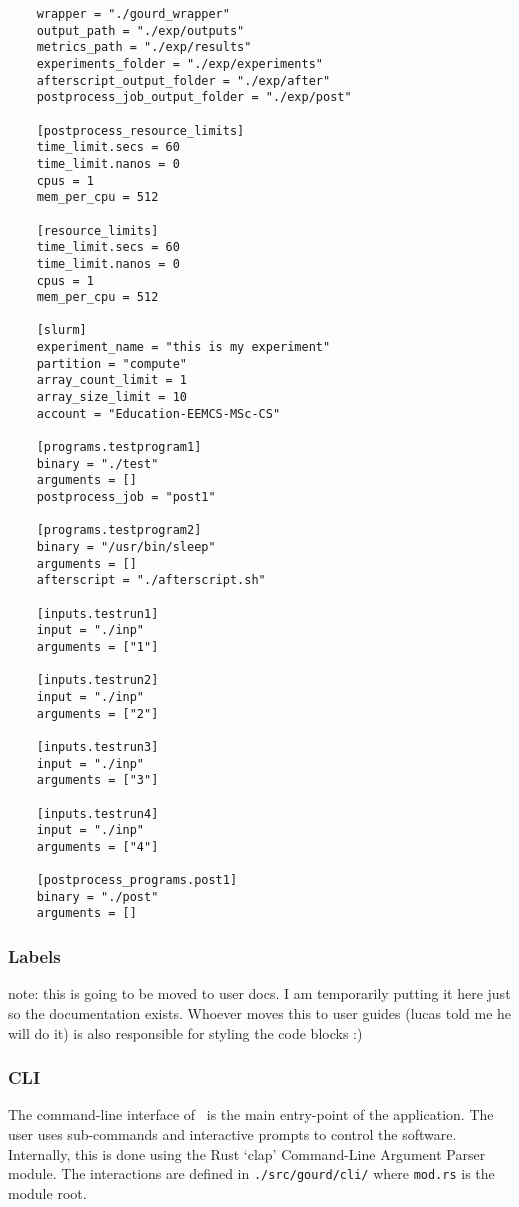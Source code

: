 \begin{verbatim}
    wrapper = "./gourd_wrapper"
    output_path = "./exp/outputs"
    metrics_path = "./exp/results"
    experiments_folder = "./exp/experiments"
    afterscript_output_folder = "./exp/after"
    postprocess_job_output_folder = "./exp/post"

    [postprocess_resource_limits]
    time_limit.secs = 60
    time_limit.nanos = 0
    cpus = 1
    mem_per_cpu = 512

    [resource_limits]
    time_limit.secs = 60
    time_limit.nanos = 0
    cpus = 1
    mem_per_cpu = 512

    [slurm]
    experiment_name = "this is my experiment"
    partition = "compute"
    array_count_limit = 1
    array_size_limit = 10
    account = "Education-EEMCS-MSc-CS"

    [programs.testprogram1]
    binary = "./test"
    arguments = []
    postprocess_job = "post1"

    [programs.testprogram2]
    binary = "/usr/bin/sleep"
    arguments = []
    afterscript = "./afterscript.sh"

    [inputs.testrun1]
    input = "./inp"
    arguments = ["1"]

    [inputs.testrun2]
    input = "./inp"
    arguments = ["2"]

    [inputs.testrun3]
    input = "./inp"
    arguments = ["3"]

    [inputs.testrun4]
    input = "./inp"
    arguments = ["4"]

    [postprocess_programs.post1]
    binary = "./post"
    arguments = []
\end{verbatim}

\subsubsection{Labels}
note: this is going to be moved to user docs.
I am temporarily putting it here just so the documentation exists.
Whoever moves this to user guides (lucas told me he will do it) is also responsible for styling the code blocks :)

\subsubsection{CLI}
The command-line interface of \gourd\ is the main entry-point of the
application.
The user uses sub-commands and interactive prompts to control
the software.
Internally, this is done using the Rust `clap' Command-Line
Argument Parser module.
The interactions are defined in
\verb|./src/gourd/cli/| where \verb|mod.rs| is the module root.

